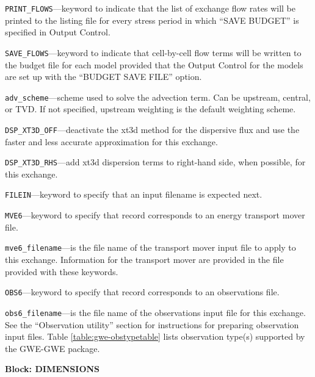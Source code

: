 \begin{description}
\item \texttt{PRINT\_FLOWS}---keyword to indicate that the list of exchange flow rates will be printed to the listing file for every stress period in which ``SAVE BUDGET'' is specified in Output Control.

\item \texttt{SAVE\_FLOWS}---keyword to indicate that cell-by-cell flow terms will be written to the budget file for each model provided that the Output Control for the models are set up with the ``BUDGET SAVE FILE'' option.

\item \texttt{adv\_scheme}---scheme used to solve the advection term.  Can be upstream, central, or TVD.  If not specified, upstream weighting is the default weighting scheme.

\item \texttt{DSP\_XT3D\_OFF}---deactivate the xt3d method for the dispersive flux and use the faster and less accurate approximation for this exchange.

\item \texttt{DSP\_XT3D\_RHS}---add xt3d dispersion terms to right-hand side, when possible, for this exchange.

\item \texttt{FILEIN}---keyword to specify that an input filename is expected next.

\item \texttt{MVE6}---keyword to specify that record corresponds to an energy transport mover file.

\item \texttt{mve6\_filename}---is the file name of the transport mover input file to apply to this exchange.  Information for the transport mover are provided in the file provided with these keywords.

\item \texttt{OBS6}---keyword to specify that record corresponds to an observations file.

\item \texttt{obs6\_filename}---is the file name of the observations input file for this exchange. See the ``Observation utility'' section for instructions for preparing observation input files. Table \ref{table:gwe-obstypetable} lists observation type(s) supported by the GWE-GWE package.

\end{description}
\item \textbf{Block: DIMENSIONS}


